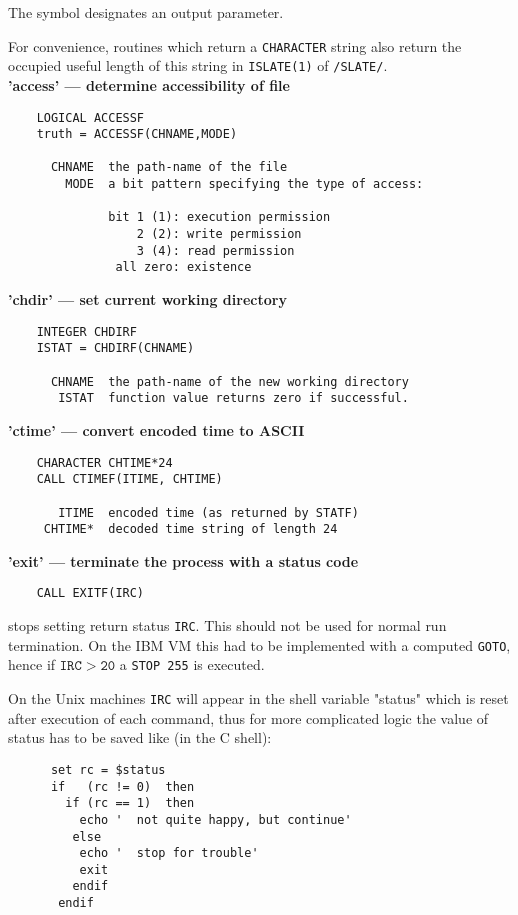 The symbol {\tt *} designates an output parameter.
 
For convenience, routines which return a {\tt CHARACTER} string
also return the occupied useful length of this string
in {\tt ISLATE(1)} of {\tt /SLATE/}. \\[2mm]
\newpage
{\bf 'access' --- determine accessibility of file}
\begin{verbatim}
    LOGICAL ACCESSF
    truth = ACCESSF(CHNAME,MODE)
 
      CHNAME  the path-name of the file
        MODE  a bit pattern specifying the type of access:
 
              bit 1 (1): execution permission
                  2 (2): write permission
                  3 (4): read permission
               all zero: existence
\end{verbatim}
 
{\bf 'chdir' --- set current working directory}
\begin{verbatim}
    INTEGER CHDIRF
    ISTAT = CHDIRF(CHNAME)
 
      CHNAME  the path-name of the new working directory
       ISTAT  function value returns zero if successful.
\end{verbatim}
 
{\bf 'ctime' --- convert encoded time to ASCII}
\begin{verbatim}
    CHARACTER CHTIME*24
    CALL CTIMEF(ITIME, CHTIME)
 
       ITIME  encoded time (as returned by STATF)
     CHTIME*  decoded time string of length 24
\end{verbatim}
 
{\bf 'exit' --- terminate the process with a status code}
\begin{verbatim}
    CALL EXITF(IRC)
\end{verbatim}
stops setting return status {\tt IRC}. This should not be used
for normal run termination. On the IBM VM this had to be implemented
with a computed {\tt GOTO}, hence if $\mathtt{IRC>20}$
a {\tt STOP 255} is executed.
\par
On the Unix machines {\tt IRC} will appear in the shell variable
"status"
which is reset after execution of each command, thus for more complicated
logic the value of status has to be saved like (in the C shell):
\begin{verbatim}
      set rc = $status
      if   (rc != 0)  then
        if (rc == 1)  then
          echo '  not quite happy, but continue'
         else
          echo '  stop for trouble'
          exit
         endif
       endif
\end{verbatim}
 
